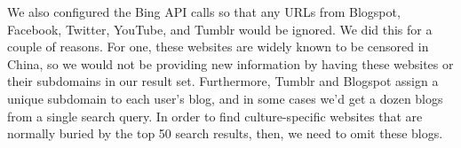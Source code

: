 We also configured the Bing API calls so that any URLs from Blogspot,
Facebook, Twitter, YouTube, and Tumblr would be ignored. We did this
for a couple of reasons. For one, these websites are widely known to
be censored in China, so we would not be providing new information by
having these websites or their subdomains in our result
set. Furthermore, Tumblr and Blogspot assign a unique subdomain to
each user's blog, and in some cases we'd get a dozen blogs from a
single search query. In order to find culture-specific websites that
are normally buried by the top 50 search results, then, we need to
omit these blogs.